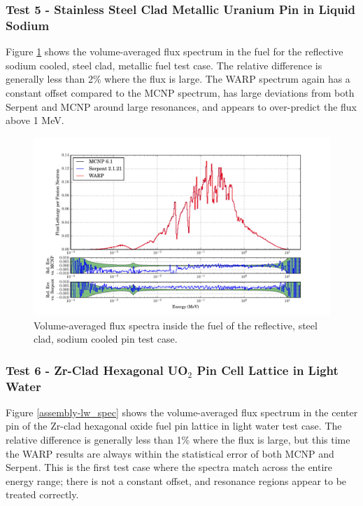 \documentclass[preprint,12pt]{elsarticle}
\begin{document}
\newpage
\subsubsection{Test 5 - Stainless Steel Clad Metallic Uranium Pin in Liquid Sodium}

Figure \ref{sodiumpin_spec} shows the volume-averaged flux spectrum in the fuel for the reflective sodium cooled, steel clad, metallic fuel test case.  The relative difference is generally less than 2\% where the flux is large.  The WARP spectrum again has a constant offset compared to the MCNP spectrum, has large deviations from both Serpent and MCNP around large resonances, and appears to over-predict the flux above 1 MeV.

\begin{figure}[h!]
\centering
\includegraphics[width=\textwidth,trim= 1cm 0cm 1cm 0cm]{graphics/sodiumpin_spec.pdf}
\caption{Volume-averaged flux spectra inside the fuel of the reflective, steel clad, sodium cooled pin test case. \label{sodiumpin_spec} }
\end{figure}


\newpage
\subsubsection{Test 6 - Zr-Clad Hexagonal UO$_2$ Pin Cell Lattice in Light Water}

Figure \ref{assembly-lw_spec} shows the volume-averaged flux spectrum in the center pin of the Zr-clad hexagonal oxide fuel pin lattice in light water test case. The relative difference is generally less than 1\% where the flux is large, but this time the WARP results are always within the statistical error of both MCNP and Serpent. This is the first test case where the spectra match across the entire energy range; there is not a constant offset, and resonance regions appear to be treated correctly.  
\end{document}
